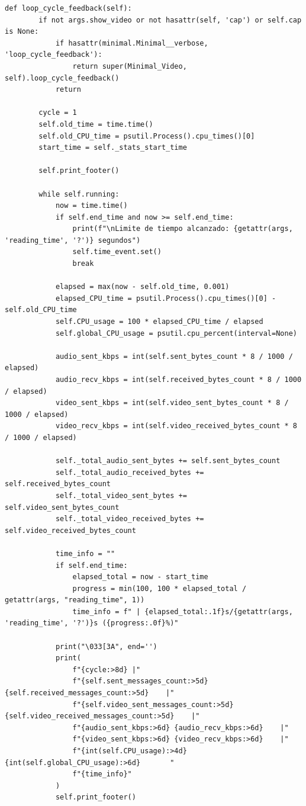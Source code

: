 \begin{lstlisting}[style=pythonstyle, caption={Método loop\_cycle\_feedback() de \textit{Minimal\_Video\_verbose}}, label={lst:loop_cycle_feedback_minimal_video_verbose}]
def loop_cycle_feedback(self):
        if not args.show_video or not hasattr(self, 'cap') or self.cap is None:
            if hasattr(minimal.Minimal__verbose, 'loop_cycle_feedback'):
                return super(Minimal_Video, self).loop_cycle_feedback()
            return

        cycle = 1
        self.old_time = time.time()
        self.old_CPU_time = psutil.Process().cpu_times()[0]
        start_time = self._stats_start_time

        self.print_footer()

        while self.running:
            now = time.time()
            if self.end_time and now >= self.end_time:
                print(f"\nLimite de tiempo alcanzado: {getattr(args, 'reading_time', '?')} segundos")
                self.time_event.set()
                break

            elapsed = max(now - self.old_time, 0.001)
            elapsed_CPU_time = psutil.Process().cpu_times()[0] - self.old_CPU_time
            self.CPU_usage = 100 * elapsed_CPU_time / elapsed
            self.global_CPU_usage = psutil.cpu_percent(interval=None)

            audio_sent_kbps = int(self.sent_bytes_count * 8 / 1000 / elapsed)
            audio_recv_kbps = int(self.received_bytes_count * 8 / 1000 / elapsed)
            video_sent_kbps = int(self.video_sent_bytes_count * 8 / 1000 / elapsed)
            video_recv_kbps = int(self.video_received_bytes_count * 8 / 1000 / elapsed)

            self._total_audio_sent_bytes += self.sent_bytes_count
            self._total_audio_received_bytes += self.received_bytes_count
            self._total_video_sent_bytes += self.video_sent_bytes_count
            self._total_video_received_bytes += self.video_received_bytes_count

            time_info = ""
            if self.end_time:
                elapsed_total = now - start_time
                progress = min(100, 100 * elapsed_total / getattr(args, "reading_time", 1))
                time_info = f" | {elapsed_total:.1f}s/{getattr(args, 'reading_time', '?')}s ({progress:.0f}%)"

            print("\033[3A", end='')
            print(
                f"{cycle:>8d} |"
                f"{self.sent_messages_count:>5d} {self.received_messages_count:>5d}    |"
                f"{self.video_sent_messages_count:>5d} {self.video_received_messages_count:>5d}    |"
                f"{audio_sent_kbps:>6d} {audio_recv_kbps:>6d}    |"
                f"{video_sent_kbps:>6d} {video_recv_kbps:>6d}    |"
                f"{int(self.CPU_usage):>4d} {int(self.global_CPU_usage):>6d}       "
                f"{time_info}"
            )
            self.print_footer()


\end{lstlisting}
